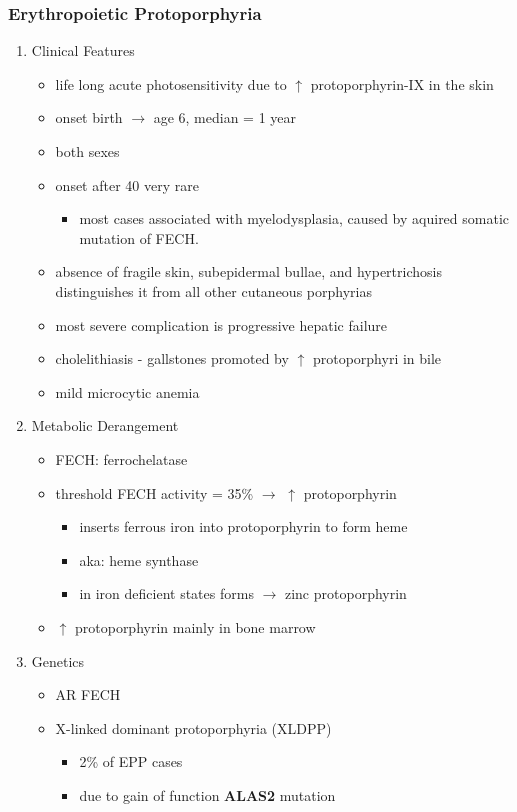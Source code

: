 \documentclass[12pt]{scrartcl}
\begin{document}
\subsubsection{Erythropoietic Protoporphyria}
\label{sec:org3153654}
\begin{enumerate}
\item Clinical Features
\label{sec:org2646983}
\begin{itemize}
\item life long acute photosensitivity due to \(\uparrow\) protoporphyrin-IX
in the skin
\item onset birth \(\to\) age 6, median = 1 year
\item both sexes
\item onset after 40 very rare
\begin{itemize}
\item most cases associated with myelodysplasia, caused by aquired
somatic mutation of FECH.
\end{itemize}
\item absence of fragile skin, subepidermal bullae, and hypertrichosis
distinguishes it from all other cutaneous porphyrias
\item most severe complication is progressive hepatic failure
\item cholelithiasis - gallstones promoted by \(\uparrow\) protoporphyri in bile
\item mild microcytic anemia
\end{itemize}

\item Metabolic Derangement
\label{sec:org4c64ff1}
\begin{itemize}
\item FECH: ferrochelatase
\item threshold FECH activity = 35\% \(\to\) \(\uparrow\) protoporphyrin
\begin{itemize}
\item inserts ferrous iron into protoporphyrin to form heme
\item aka: heme synthase
\item in iron deficient states forms \(\to\) zinc protoporphyrin
\end{itemize}
\item \(\uparrow\) protoporphyrin mainly in bone marrow
\end{itemize}

\item Genetics
\label{sec:org48eccc6}
\begin{itemize}
\item AR FECH
\item X-linked dominant protoporphyria (XLDPP)
\begin{itemize}
\item 2\% of EPP cases
\item due to gain of function \textbf{ALAS2} mutation
\end{itemize}
\end{itemize}


\end{enumerate}
\end{document}
